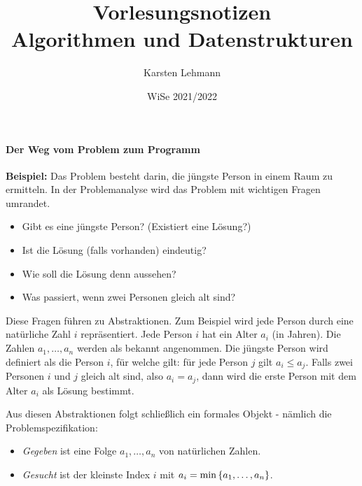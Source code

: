 \documentclass{scrreprt}
\author{Karsten Lehmann}
\date{WiSe 2021/2022}
\title{Vorlesungsnotizen\\Algorithmen und Datenstrukturen}
\begin{document}
\paragraph{Der Weg vom Problem zum Programm}

\begin{center}
\end{center}

\textbf{Beispiel:} Das Problem besteht darin, die jüngste Person in einem Raum
zu ermitteln.
In der Problemanalyse wird das Problem mit wichtigen Fragen umrandet.
\begin{itemize}
\item Gibt es eine jüngste Person? (Existiert eine Lösung?)
\item Ist die Lösung (falls vorhanden) eindeutig?
\item Wie soll die Lösung denn aussehen?
\item Was passiert, wenn zwei Personen gleich alt sind?
\end{itemize}

Diese Fragen führen zu Abstraktionen.
Zum Beispiel wird jede Person durch eine natürliche Zahl $i$ repräsentiert.
Jede Person $i$ hat ein Alter $a_i$ (in Jahren).
Die Zahlen $a_1, \ldots, a_n$ werden als bekannt angenommen.
Die jüngste Person wird definiert als die Person $i$, für welche gilt:
für jede Person $j$ gilt $a_i \leq a_j$.
Falls zwei Personen $i$ und $j$ gleich alt sind, also $a_i = a_j$, dann wird die
erste Person mit dem Alter $a_i$ als Lösung bestimmt.

Aus diesen Abstraktionen folgt schließlich ein formales Objekt - nämlich die
Problemspezifikation:
\begin{itemize}
\item \emph{Gegeben} ist eine Folge $a_1, \ldots, a_n$ von natürlichen Zahlen.
\item \emph{Gesucht} ist der kleinste Index $i$ mit
  $a_i = \min\qty{a_1, \ldots, a_n}$.
\end{itemize}
\end{document}

